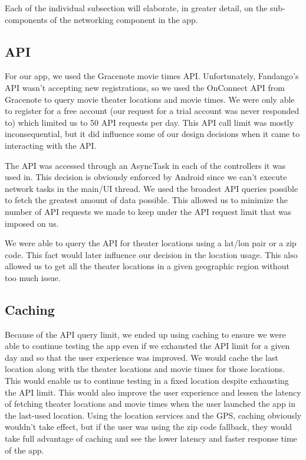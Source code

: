 \documentclass{article}
\begin{document}
    Each of the individual subsection will elaborate, in greater detail, on the sub-components
    of the networking component in the app.
    \subsection*{API}
    For our app, we used the Gracenote movie times API. Unfortunately, Fandango's API wasn't
    accepting new registrations, so we used the OnConnect API from Gracenote to query movie
    theater locations and movie times. We were only able to register for a free account (our
    request for a trial account was never responded to) which limited us to 50 API requests
    per day. This API call limit was mostly inconsequential, but it did influence some of
    our design decisions when it came to interacting with the API.

    The API was accessed through an AsyncTask in each of the controllers it was used in.
    This decision is obviously enforced by Android since we can't execute network tasks
    in the main/UI thread. We used the broadest API queries possible to fetch the greatest
    amount of data possible. This allowed us to minimize the number of API requests we made
    to keep under the API request limit that was imposed on us.

    We were able to query the API for theater locations using a lat/lon pair or a zip code.
    This fact would later influence our decision in the location usage. This also allowed us
    to get all the theater locations in a given geographic region without too much issue.
    \subsection*{Caching}
    Because of the API query limit, we ended up using caching to ensure we were able to continue
    testing the app even if we exhausted the API limit for a given day and so that the user
    experience was improved. We would cache the last location along with the theater locations
    and movie times for those locations. This would enable us to continue testing in a fixed location
    despite exhausting the API limit. This would also improve the user experience and lessen the latency
    of fetching theater locations and movie times when the user launched the app in the last-used location.
    Using the location services and the GPS, caching obviously wouldn't take effect, but if the user was
    using the zip code fallback, they would take full advantage of caching and see the lower latency and
    faster response time of the app.
\end{document}
